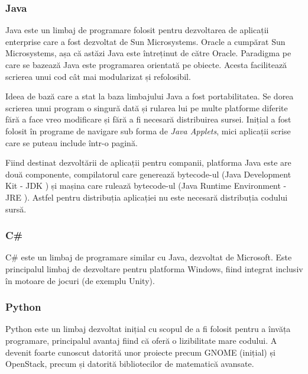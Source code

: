 \subsubsection{Java}
\label{sec:appdev:hybrid-lang:java}

Java este un limbaj de programare folosit pentru dezvoltarea de aplicații
enterprise care a fost dezvoltat de Sun Microsystems. Oracle a cumpărat Sun
Microsystems, așa că astăzi Java este întreținut de către Oracle. Paradigma pe
care se bazează Java este programarea orientată pe obiecte. Acesta facilitează
scrierea unui cod cât mai modularizat și refolosibil.

Ideea de bază care a stat la baza limbajului Java a fost portabilitatea. Se dorea
scrierea unui program o singură dată și rularea lui pe multe platforme diferite
fără a face vreo modificare și fără a fi necesară distribuirea sursei. Inițial a
fost folosit în programe de navigare sub forma de \textit{Java Applets}, mici
aplicații scrise care se puteau include într-o pagină.

Fiind destinat dezvoltării de aplicații pentru companii, platforma Java este are
două componente, compilatorul care generează bytecode-ul (Java Development Kit -
JDK ) și mașina care rulează bytecode-ul (Java
Runtime Environment - JRE ). Astfel pentru
distribuția aplicației nu este necesară distribuția codului sursă.

\subsubsection{C\#}
\label{sec:appdev:hybrid-lang:csharp}

C\# este un limbaj de programare similar cu Java, dezvoltat de Microsoft. Este
principalul limbaj de dezvoltare pentru platforma Windows, fiind integrat
inclusiv în motoare de jocuri (de exemplu Unity).

\subsubsection{Python}
\label{sec:appdev:hybrid-lang:python}

Python este un limbaj dezvoltat inițial cu scopul de a fi folosit pentru a
învăța programare, principalul avantaj fiind că oferă o lizibilitate mare
codului. A devenit foarte cunoscut datorită unor proiecte precum GNOME (inițial)
și OpenStack, precum și datorită bibliotecilor de matematică avansate.

